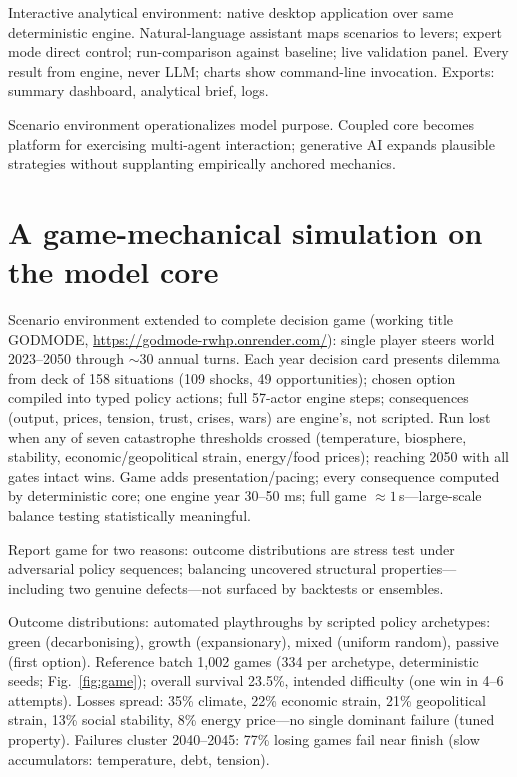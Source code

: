 \documentclass[a4paper,fleqn]{cas-sc}
\begin{document}
Interactive analytical environment: native desktop application over same deterministic engine. Natural-language assistant maps scenarios to levers; expert mode direct control; run-comparison against baseline; live validation panel. Every result from engine, never LLM; charts show command-line invocation. Exports: summary dashboard, analytical brief, logs.

Scenario environment operationalizes model purpose. Coupled core becomes platform for exercising multi-agent interaction; generative AI expands plausible strategies without supplanting empirically anchored mechanics.

\section{A game-mechanical simulation on the model core}
\label{sec:game}

Scenario environment extended to complete decision game (working title GODMODE, \url{https://godmode-rwhp.onrender.com/}): single player steers world 2023--2050 through ${\sim}30$ annual turns. Each year decision card presents dilemma from deck of 158 situations (109 shocks, 49 opportunities); chosen option compiled into typed policy actions; full 57-actor engine steps; consequences (output, prices, tension, trust, crises, wars) are engine's, not scripted. Run lost when any of seven catastrophe thresholds crossed (temperature, biosphere, stability, economic/geopolitical strain, energy/food prices); reaching 2050 with all gates intact wins. Game adds presentation/pacing; every consequence computed by deterministic core; one engine year 30--50 ms; full game ${\approx}1$\,s---large-scale balance testing statistically meaningful.

Report game for two reasons: outcome distributions are stress test under adversarial policy sequences; balancing uncovered structural properties---including two genuine defects---not surfaced by backtests or ensembles.

Outcome distributions: automated playthroughs by scripted policy archetypes: green (decarbonising), growth (expansionary), mixed (uniform random), passive (first option). Reference batch 1,002 games (334 per archetype, deterministic seeds; Fig.~\ref{fig:game}); overall survival 23.5\%, intended difficulty (one win in 4--6 attempts). Losses spread: 35\% climate, 22\% economic strain, 21\% geopolitical strain, 13\% social stability, 8\% energy price---no single dominant failure (tuned property). Failures cluster 2040--2045: 77\% losing games fail near finish (slow accumulators: temperature, debt, tension).
\end{document}
